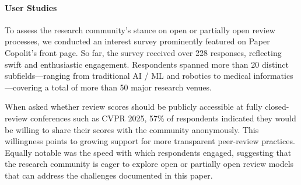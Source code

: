 \paragraph{User Studies}
To assess the research community’s stance on open or partially open review processes, we conducted an interest survey prominently featured on Paper Copolit’s front page. So far, the survey received over 228 responses, reflecting swift and enthusiastic engagement. Respondents spanned more than 20 distinct subfields—ranging from traditional AI / ML and robotics to medical informatics—covering a total of more than 50 major research venues.

When asked whether review scores should be publicly accessible at fully closed-review conferences such as CVPR 2025, 57\% of respondents indicated they would be willing to share their scores with the community anonymously. This willingness points to growing support for more transparent peer-review practices. Equally notable was the speed with which respondents engaged, suggesting that the research community is eager to explore open or partially open review models that can address the challenges documented in this paper. 







